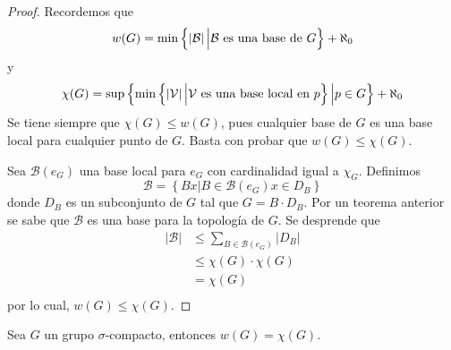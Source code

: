 \documentclass[12pt]{report}
\theoremstyle{largebreak}
\newcommand\abs[1]{\ensuremath{\left|#1\right|}}
\begin{document}
    \begin{proof}
        Recordemos que
        \begin{equation*}
            w(G)=\min\left\{\abs{\mathcal{B}}\Big|\mathcal{B}\textup{ es una base de }G \right\}+\aleph_0
        \end{equation*}
        y
        \begin{equation*}
            \chi(G)=\sup\left\{\min\left\{\abs{\mathcal{V}}\Big|\mathcal{V}\textup{ es una base local en }p \right\}\Big|p\in G \right\}+\aleph_0
        \end{equation*}
        Se tiene siempre que $\chi(G)\leq w(G)$, pues cualquier base de $G$ es una base local para cualquier punto de $G$. Basta con probar que $w(G)\leq\chi(G)$.

        Sea $\mathcal{B}(e_G)$ una base local para $e_G$ con cardinalidad igual a $\chi_G$. Definimos
        \begin{equation*}
            \mathcal{B}=\left\{Bx\Big|B\in\mathcal{B}(e_G)x\in D_B \right\}
        \end{equation*}
        donde $D_B$ es un subconjunto de $G$ tal que $G=B\cdot D_B$. Por un teorema anterior se sabe que $\mathcal{B}$ es una base para la topología de $G$. Se desprende que
        \begin{equation*}
            \begin{split}
                \abs{\mathcal{B}}&\leq\sum_{ B\in\mathcal{B}(e_G)}\abs{D_B}\\
                &\leq\chi(G)\cdot\chi(G)\\
                &=\chi(G)\\
            \end{split}
        \end{equation*}
        por lo cual, $w(G)\leq\chi(G)$.
    \end{proof}

    \begin{cor}
        Sea $G$ un grupo $\sigma$-compacto, entonces $w(G)=\chi(G)$.
    \end{cor}
\end{document}
